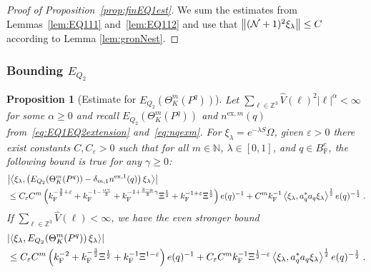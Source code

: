 \documentclass[12pt,a4paper]{article}
\numberwithin{equation}{section}
\newcommand{\NNN}{\mathbb{N}}
\newcommand{\1}{\mathbb{I}}
\newcommand{\ex}{\mathrm{ex}}
\newcommand{\F}{\mathrm{F}}
\newcommand{\Zstar}{\mathbb{Z}^3} %
\newcommand{\Z}{\mathbb{Z}}
\newcommand{\NN}{\mathcal{N}}
\newcommand{\half}{\frac{1}{2}}
\newcommand{\eva}[1]{\left\langle #1 \right\rangle}
\theoremstyle{plain}
\newtheorem{proposition}[theorem]{Proposition}
\theoremstyle{definition}
\theoremstyle{remark}
\theoremstyle{plain}
\theoremstyle{definition}
\theoremstyle{remark}
\begin{document}
\begin{proof}[Proof of Proposition~\ref{prop:finEQ1est}]
We sum the estimates from Lemmas~\ref{lem:EQ111} and~\ref{lem:EQ112} and use that $ \norm{(\NN+1)^2 \xi_\lambda} \le C $ according to Lemma \ref{lem:gronNest}.
\end{proof}






\subsubsection{Bounding $E_{Q_2}$}


\begin{proposition}[Estimate for $E_{Q_2}(\Theta^m_{K}(P^q))$]\label{prop:finEQ2est}
Let $ \sum_{\ell \in \Zstar} \hat{V}(\ell)^2 |\ell|^\alpha < \infty $ for some $ \alpha \ge 0 $ and recall $ E_{Q_2}(\Theta^m_K(P^q)) $ and $ n^{\ex,m}(q) $ from~\eqref{eq:EQ1EQ2extension} and~\eqref{eq:nqexm}. For $\xi_\lambda = e^{-\lambda S} \Omega$, given $ \varepsilon > 0 $ there exist constants $ C, C_\varepsilon > 0 $ such that for all $ m \in \NNN $, $ \lambda \in [0,1] $, and $ q \in B_{\F}^c $, the following bound is true for any $ \gamma \ge 0 $:
\begin{align}\label{eq:finEQ2est_Coulomb}
	&\abs{\eva{\xi_\lambda, \left( E_{Q_2}(\Theta^m_K(P^q))- \delta_{m,1} n^{\ex,1}(q) \right) \xi_\lambda}} \nonumber\\
	&\leq C_\varepsilon C^m \left( k_{\F}^{-\frac 32 + \varepsilon} 
		+ k_{\F}^{-1 - \frac{\alpha \gamma}{2}} 
		+ k_{\F}^{-1+ \frac{3-\alpha}{2} \gamma} \Xi^\half
		+ k_{\F}^{-1+\varepsilon} \Xi^\half \right) e(q)^{-1} 
		+ C^m k_{\F}^{-1} \eva{\xi_\lambda, a_q^* a_q \xi_\lambda}^{\half} e(q)^{-\half}  \;.
\end{align}
If $ \sum_{\ell \in \Zstar} \hat{V}(\ell) < \infty $, we have the even stronger bound
\begin{align}\label{eq:finEQ2est}
	&\abs{\eva{\xi_\lambda, E_{Q_2}\!\left(\Theta^m_K(P^q)\right) \xi_\lambda}} \nonumber\\
	&\leq C_\varepsilon C^m \left( k_{\F}^{-2}
		+ k_{\F}^{-\frac{3}{2}} \Xi^\half
		+ k_{\F}^{-1} \Xi^{1-\varepsilon} \right) e(q)^{-1} 
		+ C_\varepsilon C^m k_{\F}^{-1} \Xi^{\half - \varepsilon} \eva{\xi_\lambda, a_q^* a_q \xi_\lambda}^{\half} e(q)^{-\half} \;. \\
\end{align}
\end{proposition}
\end{document}
